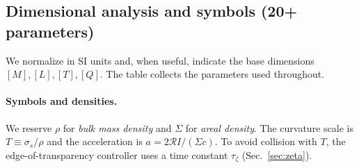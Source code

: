 \documentclass[aps,pre,twocolumn,showpacs,superscriptaddress]{revtex4-2}
\theoremstyle{definition}
\begin{document}
\subsection{Dimensional analysis and symbols (20+ parameters)}

We normalize in SI units and, when useful, indicate the base dimensions $[M],[L],[T],[Q]$. The table collects the parameters used throughout.

\paragraph*{Symbols and densities.}
We reserve $\rho$ for \emph{bulk mass density} and $\Sigma$ for \emph{areal density}. The curvature scale is $T\equiv \sigma_s/\rho$ and the acceleration is $a=2\mathcal{R}I/(\Sigma c)$.
To avoid collision with $T$, the edge-of-transparency controller uses a time constant $\tau_\zeta$ (Sec.~\ref{sec:zeta}).
\end{document}
